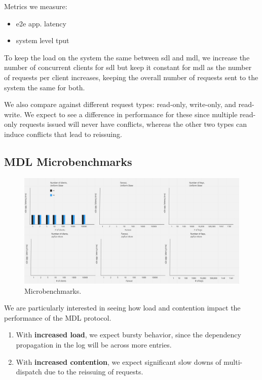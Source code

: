 Metrics we measure:
\begin{itemize}
    \item e2e app. latency
    \item system level tput
\end{itemize}

To keep the load on the system the same between sdl and mdl, we increase the number of concurrent clients for sdl but keep it constant for mdl as the number of requests per client increases, keeping the overall number of requests sent to the system the same for both.

We also compare against different request types: read-only, write-only, and read-write. We expect to see a difference in performance for these since multiple read-only requests issued will never have conflicts, whereas the other two types can induce conflicts that lead to reissuing.

\subsection{MDL Microbenchmarks}

\begin{figure}[hbt!]
\includegraphics[scale=.36]{microbenchmarks.png}
\caption{Microbenchmarks.}
\label{fig:microben}
\end{figure}

We are particularly interested in seeing how load and contention impact the performance of the MDL protocol. 
\begin{enumerate}
    \item With \textbf{increased load}, we expect bursty behavior, since the dependency propagation in the log will be across more entries.
    \item With \textbf{increased contention}, we expect significant slow downs of multi-dispatch due to the reissuing of requests.
\end{enumerate}  

